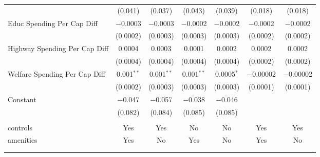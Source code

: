 \begin{table}[!htbp]
\begin{tabular}{@{\extracolsep{5pt}}lcccccc}
  & (0.041) & (0.037) & (0.043) & (0.039) & (0.018) & (0.018) \\ 
  Educ Spending Per Cap Diff & $-$0.0003 & $-$0.0003 & $-$0.0002 & $-$0.0002 & $-$0.0002 & $-$0.0002 \\ 
  & (0.0002) & (0.0003) & (0.0003) & (0.0003) & (0.0002) & (0.0002) \\ 
  Highway Spending Per Cap Diff & 0.0004 & 0.0003 & 0.0001 & 0.0002 & 0.0002 & 0.0002 \\ 
  & (0.0004) & (0.0004) & (0.0004) & (0.0004) & (0.0002) & (0.0002) \\ 
  Welfare Spending Per Cap Diff & 0.001$^{**}$ & 0.001$^{**}$ & 0.001$^{**}$ & 0.0005$^{*}$ & $-$0.00002 & $-$0.00002 \\ 
  & (0.0002) & (0.0003) & (0.0003) & (0.0003) & (0.0001) & (0.0001) \\ 
  Constant & $-$0.047 & $-$0.057 & $-$0.038 & $-$0.046 &  &  \\ 
  & (0.082) & (0.084) & (0.085) & (0.085) &  &  \\ 
 \hline \\[-1.8ex] 
controls & Yes & Yes & No & No & Yes & Yes \\ 
amenities & Yes & No & Yes & No & Yes & No \\ 
\hline \\[-1.8ex] 
\hline 
\hline \\[-1.8ex] 
\end{tabular} 
\end{table} 
